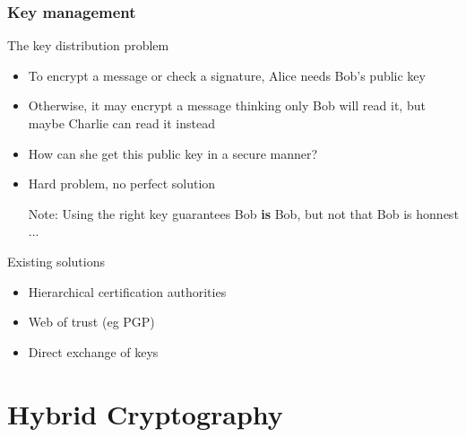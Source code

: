 \documentclass[
hyperref={pdfpagelabels=false}
,xcolor=table
]
{beamer}
\begin{document}
\begin{frame}
  \frametitle{Key management}

  \begin{block}{The key distribution problem}
    \begin{itemize}
    \item To encrypt a message or check a signature, Alice needs Bob's public key
    \item Otherwise, it may encrypt a message thinking only Bob will read it, but maybe Charlie can read it instead
    \item How can she get this public key in a secure manner? 
    \item Hard problem, no perfect solution
    \item[Note: ] Using the right key guarantees Bob \textbf{is} Bob, but not that Bob is honnest ... 
    \end{itemize}
  \end{block}

  \begin{block}{Existing solutions}
    \begin{itemize}
    \item Hierarchical certification authorities
    \item Web of trust (eg PGP)
    \item Direct exchange of keys
    \end{itemize}
  \end{block}
\end{frame}


\section{Hybrid Cryptography}
\end{document}
